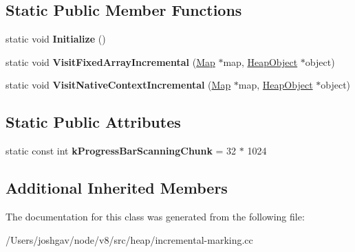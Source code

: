 \subsection*{Static Public Member Functions}
\begin{DoxyCompactItemize}
\item 
static void {\bfseries Initialize} ()\hypertarget{classv8_1_1internal_1_1_incremental_marking_marking_visitor_a9543433873f682305c4dcee582ed4706}{}\label{classv8_1_1internal_1_1_incremental_marking_marking_visitor_a9543433873f682305c4dcee582ed4706}

\item 
static void {\bfseries Visit\+Fixed\+Array\+Incremental} (\hyperlink{classv8_1_1internal_1_1_map}{Map} $\ast$map, \hyperlink{classv8_1_1internal_1_1_heap_object}{Heap\+Object} $\ast$object)\hypertarget{classv8_1_1internal_1_1_incremental_marking_marking_visitor_a05d6acf8235d92389df857853f8370ba}{}\label{classv8_1_1internal_1_1_incremental_marking_marking_visitor_a05d6acf8235d92389df857853f8370ba}

\item 
static void {\bfseries Visit\+Native\+Context\+Incremental} (\hyperlink{classv8_1_1internal_1_1_map}{Map} $\ast$map, \hyperlink{classv8_1_1internal_1_1_heap_object}{Heap\+Object} $\ast$object)\hypertarget{classv8_1_1internal_1_1_incremental_marking_marking_visitor_a922b8c88cdf65a44af09ce0e66d9f25a}{}\label{classv8_1_1internal_1_1_incremental_marking_marking_visitor_a922b8c88cdf65a44af09ce0e66d9f25a}

\end{DoxyCompactItemize}
\subsection*{Static Public Attributes}
\begin{DoxyCompactItemize}
\item 
static const int {\bfseries k\+Progress\+Bar\+Scanning\+Chunk} = 32 $\ast$ 1024\hypertarget{classv8_1_1internal_1_1_incremental_marking_marking_visitor_a61f5c54bfa5d116d78ef294817215b4b}{}\label{classv8_1_1internal_1_1_incremental_marking_marking_visitor_a61f5c54bfa5d116d78ef294817215b4b}

\end{DoxyCompactItemize}
\subsection*{Additional Inherited Members}


The documentation for this class was generated from the following file\+:\begin{DoxyCompactItemize}
\item 
/\+Users/joshgav/node/v8/src/heap/incremental-\/marking.\+cc\end{DoxyCompactItemize}
